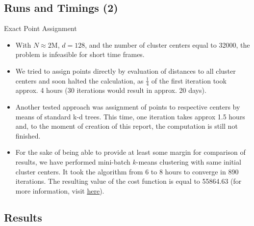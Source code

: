 \subsection{Runs and Timings (2)}

\begin{frame}
	
	\begin{block}{Exact Point Assignment}
		
		\begin{itemize}
			\item With $N \approx 2$M, $d = 128$, and the number of cluster centers equal to 32000, the problem is infeasible for short time frames.
			
			\item We tried to assign points directly by evaluation of distances to all cluster centers and soon halted the calculation, as $\frac{1}{4}$ of the first iteration took approx. 4 hours (30 iterations would result in approx. 20 days).
			
			\item Another tested approach was assignment of points to respective centers by means of standard k-d trees. This time, one iteration takes approx 1.5 hours and, to the moment of creation of this report, the computation is still not finished.
			
			\item For the sake of being able to provide at least some margin for comparison of results, we have performed mini-batch $k$-means clustering \cite{Sculley2010} with same initial cluster centers. It took the algorithm from 6 to 8 hours to converge in 890 iterations. The resulting value of the cost function is equal to 55864.63 (for more information, visit \href{https://github.com/salisaresama/computer-vision/blob/flann-32k/_aux/kmeans_std.ipynb}{{\color{blue} \underline{here}}}).
		\end{itemize}
		
	\end{block}

\end{frame}


\subsection{Results}

